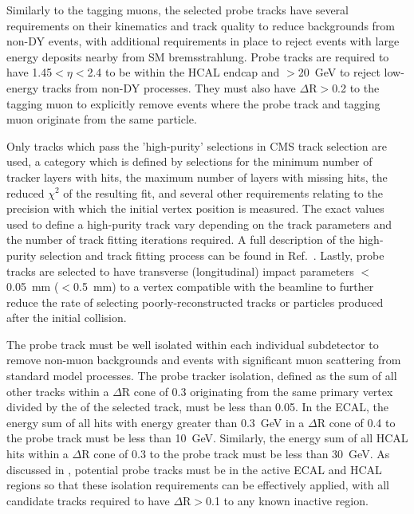 Similarly to the tagging muons, the selected probe tracks have several requirements on their kinematics and track quality to reduce backgrounds from non-DY events, with additional requirements in place to reject events with large energy deposits nearby from SM bremsstrahlung.
Probe tracks are required to have 1.45$<\eta<$2.4 to be within the HCAL endcap and \pt$>$\SI{20}{\giga\eV} to reject low-energy tracks from non-DY processes.
They must also have $\Delta\mathrm{R}>$0.2 to the tagging muon to explicitly remove events where the probe track and tagging muon originate from the same particle.

Only tracks which pass the 'high-purity' selections in CMS track selection are used, a category which is defined by selections for the minimum number of tracker layers with hits, the maximum number of layers with missing hits, the reduced $\chi^2$ of the resulting fit, and several other requirements relating to the precision with which the initial vertex position is measured.
The exact values used to define a high-purity track vary depending on the track parameters and the number of track fitting iterations required. 
A full description of the high-purity selection and track fitting process can be found in Ref.~\cite{trackFitting}.
Lastly, probe tracks are selected to have transverse (longitudinal) impact parameters $<$\SI{0.05}{\milli\meter} ($<$\SI{0.5}{\milli\meter}) to a vertex compatible with the beamline to further reduce the rate of selecting poorly-reconstructed tracks or particles produced after the initial collision.

The probe track must be well isolated within each individual subdetector to remove non-muon backgrounds and events with significant muon scattering from standard model processes. 
The probe tracker isolation, defined as the \pt sum of all other tracks within a $\Delta$R cone of 0.3 originating from the same primary vertex divided by the \pt of the selected track, must be less than 0.05.
In the ECAL, the energy sum of all hits with energy greater than \SI{0.3}{\giga\eV} in a $\Delta$R cone of 0.4 to the probe track must be less than \SI{10}{\giga\eV}.
Similarly, the energy sum of all HCAL hits within a $\Delta$R cone of 0.3 to the probe track must be less than \SI{30}{\giga\eV}. 
As discussed in , potential probe tracks must be in the active ECAL and HCAL regions so that these isolation requirements can be effectively applied, with all candidate tracks required to have $\Delta$R$>$0.1 to any known inactive region.

